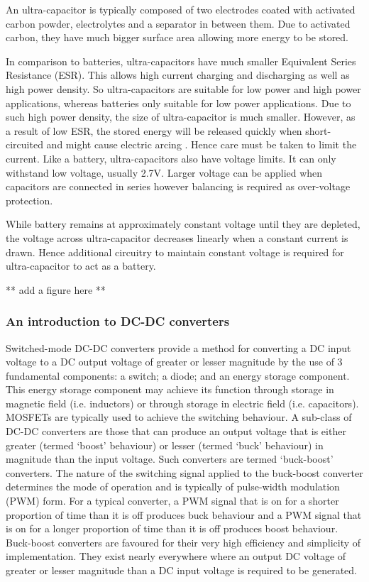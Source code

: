 An ultra-capacitor is typically composed of two electrodes coated with activated carbon powder, electrolytes and a separator in between them. Due to activated carbon, they have much bigger surface area allowing more energy to be stored. 

In comparison to batteries, ultra-capacitors have much smaller Equivalent Series Resistance (ESR). This allows high current charging and discharging as well as high power density. So ultra-capacitors are suitable for low power and high power applications, whereas batteries only suitable for low power applications. Due to such high power density, the size of ultra-capacitor is much smaller. However, as a result of low ESR, the stored energy will be released quickly when short-circuited and might cause electric arcing \cite{murata}. Hence care must be taken to limit the current. Like a battery, ultra-capacitors also have voltage limits. It can only withstand low voltage, usually 2.7V. Larger voltage can be applied when capacitors are connected in series however balancing is required as over-voltage protection. 

While battery remains at approximately constant voltage until they are depleted, the voltage across ultra-capacitor decreases linearly when a constant current is drawn. Hence additional circuitry to maintain constant voltage is required for ultra-capacitor to act as a battery. 

** add a figure here **

\subsubsection{An introduction to DC-DC converters}
Switched-mode DC-DC converters provide a method for converting a DC input voltage to a DC output voltage of greater or lesser magnitude by the use of 3 fundamental components: a switch; a diode; and an energy storage component. This energy storage component may achieve its function through storage in magnetic field (i.e. inductors) or through storage in electric field (i.e. capacitors). MOSFETs are typically used to achieve the switching behaviour.
\newpar
A sub-class of DC-DC converters are those that can produce an output voltage that is either greater (termed `boost' behaviour) or lesser (termed `buck' behaviour) in magnitude than the input voltage. Such converters are termed `buck-boost' converters. The nature of the switching signal applied to the buck-boost converter determines the mode of operation and is typically of pulse-width modulation (PWM) form. For a typical converter, a PWM signal that is on for a shorter proportion of time than it is off produces buck behaviour and a PWM signal that is on for a longer proportion of time than it is off produces boost behaviour.
\newpar
Buck-boost converters are favoured for their very high efficiency and simplicity of implementation. They exist nearly everywhere where an output DC voltage of greater or lesser magnitude than a DC input voltage is required to be generated.
